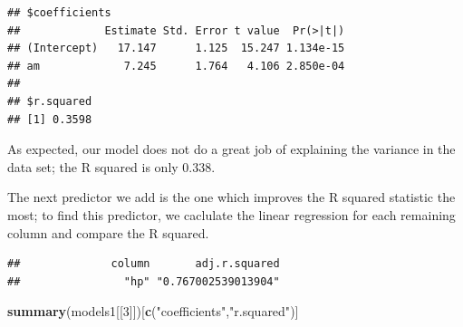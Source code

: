\documentclass[]{article}
\newenvironment{Shaded}{\begin{snugshade}}{\end{snugshade}}
\newcommand{\KeywordTok}[1]{\textcolor[rgb]{0.13,0.29,0.53}{\textbf{{#1}}}}
\newcommand{\DataTypeTok}[1]{\textcolor[rgb]{0.13,0.29,0.53}{{#1}}}
\newcommand{\DecValTok}[1]{\textcolor[rgb]{0.00,0.00,0.81}{{#1}}}
\newcommand{\StringTok}[1]{\textcolor[rgb]{0.31,0.60,0.02}{{#1}}}
\newcommand{\OtherTok}[1]{\textcolor[rgb]{0.56,0.35,0.01}{{#1}}}
\newcommand{\NormalTok}[1]{{#1}}
\begin{document}
\begin{verbatim}
## $coefficients
##             Estimate Std. Error t value  Pr(>|t|)
## (Intercept)   17.147      1.125  15.247 1.134e-15
## am             7.245      1.764   4.106 2.850e-04
## 
## $r.squared
## [1] 0.3598
\end{verbatim}

As expected, our model does not do a great job of explaining the
variance in the data set; the R squared is only 0.338.

The next predictor we add is the one which improves the R squared
statistic the most; to find this predictor, we caclulate the linear
regression for each remaining column and compare the R squared.

\begin{Shaded}
\end{Shaded}

\begin{verbatim}
##              column       adj.r.squared 
##                "hp" "0.767002539013904"
\end{verbatim}

\begin{Shaded}
\begin{Highlighting}[]
\KeywordTok{summary}\NormalTok{(models1[[}\DecValTok{3}\NormalTok{]])[}\KeywordTok{c}\NormalTok{(}\StringTok{"coefficients"}\NormalTok{,}\StringTok{"r.squared"}\NormalTok{)]}
\end{Highlighting}
\end{Shaded}
\end{document}
